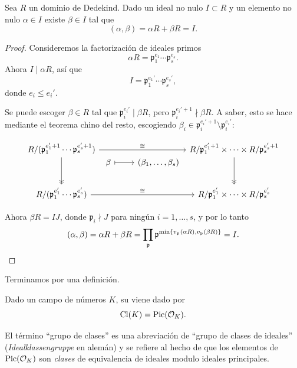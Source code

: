 \begin{proposicion}
  \label{prop:generacion-de-ideales-por-dos-elementos}
  Sea $R$ un dominio de Dedekind. Dado un ideal no nulo $I \subset R$ y un
  elemento no nulo $\alpha \in I$ existe $\beta \in I$ tal que
  $$(\alpha,\beta) = \alpha R + \beta R = I.$$

  \begin{proof}
    Consideremos la factorización de ideales primos
    $$\alpha R = \mathfrak{p}_1^{e_1}\cdots\mathfrak{p}_s^{e_s}.$$
    Ahora $I \mid \alpha R$, así que
    $$I = \mathfrak{p}_1^{e_1'}\cdots \mathfrak{p}_s^{e_s'},$$
    donde $e_i \le e_i'$.

    Se puede escoger $\beta \in R$ tal que $\mathfrak{p}_i^{e_i'} \mid \beta R$,
    pero $\mathfrak{p}_i^{e_i' + 1} \nmid \beta R$. A saber, esto se hace
    mediante el teorema chino del resto, escogiendo
    $\beta_i \in \mathfrak{p}_i^{e_i'+1}\setminus\mathfrak{p}_i^{e_i'}$:

    \[ \begin{tikzcd}
      R/(\mathfrak{p}_1^{e_1'+1}\cdots\mathfrak{p}_s^{e_s'+1}) \ar{rrr}{\cong}\ar[->>]{dd} &[-2em] &&[-2em]
      R/\mathfrak{p}_1^{e_1'+1}\times\cdots\times R/\mathfrak{p}_s^{e_s'+1} \ar[->>]{dd} \\[-2em]
      & \beta \ar[|->]{r} & (\beta_1, \ldots, \beta_s) \\
      R/(\mathfrak{p}_1^{e_1'}\cdots\mathfrak{p}_s^{e_s'}) \ar{rrr}{\cong} &&&
      R/\mathfrak{p}_1^{e_1'}\times\cdots\times R/\mathfrak{p}_s^{e_s'}
    \end{tikzcd} \]

    Ahora $\beta R = IJ$, donde $\mathfrak{p}_i \nmid J$ para ningún
    $i = 1,\ldots,s$, y por lo tanto
    \[ (\alpha,\beta) =
       \alpha R + \beta R =
       \prod_\mathfrak{p}
         \mathfrak{p}^{\min \{ v_\mathfrak{p} (\alpha R), v_\mathfrak{p} (\beta R) \}}
       = I. \qedhere \]
  \end{proof}
\end{proposicion}

Terminamos por una definición.

\begin{definicion}
  Dado un campo de números $K$, su  viene dado por
  $$\operatorname{Cl} (K) = \operatorname{Pic} (\mathcal{O}_K).$$
\end{definicion}

El término ``grupo de clases'' es una abreviación de ``grupo de clases
de ideales'' (\emph{Idealklassengruppe} en alemán) y se refiere al hecho de que
los elementos de $\operatorname{Pic} (\mathcal{O}_K)$ son \emph{clases} de equivalencia de ideales
modulo ideales principales.

